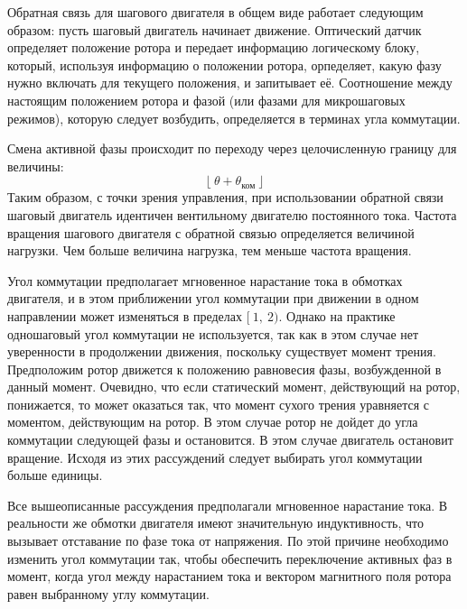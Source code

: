 Обратная связь для шагового двигателя в общем виде работает следующим образом:
пусть шаговый двигатель начинает движение. Оптический датчик определяет положение ротора и передает
информацию логическому блоку, который, используя информацию о положении ротора, орпеделяет, какую фазу
нужно включать для текущего положения, и запитывает её. Соотношение между настоящим положением
ротора и фазой (или фазами для микрошаговых режимов), которую следует возбудить, определяется
в терминах угла коммутации.

Смена активной фазы происходит по переходу через целочисленную границу для величины:
$$
    \lfloor ~\theta + \theta_{\textit{ком}}~ \rfloor
$$
Таким образом, с точки зрения управления, при использовании обратной связи шаговый двигатель идентичен
вентильному двигателю постоянного тока.
Частота вращения шагового двигателя с обратной связью определяется величиной нагрузки. Чем больше величина
нагрузка, тем меньше частота вращения.

Угол коммутации предполагает мгновенное нарастание тока в обмотках двигателя, и в этом приближении
угол коммутации при движении в одном направлении может изменяться в пределах $[~1,~2)$.
Однако на практике одношаговый угол коммутации не используется, так как в этом случае нет
уверенности в продолжении движения, поскольку существует момент трения. Предположим ротор движется к
положению равновесия фазы, возбужденной в данный момент. Очевидно, что если статический момент, действующий
на ротор, понижается, то может оказаться так, что момент сухого трения уравняется с моментом,
действующим на ротор. В этом случае ротор не дойдет до угла коммутации следующей фазы и
остановится. В этом случае двигатель остановит вращение. Исходя из этих рассуждений следует
выбирать угол коммутации больше единицы.

Все вышеописанные рассуждения предполагали мгновенное нарастание тока. В реальности же обмотки двигателя
имеют значительную индуктивность, что вызывает отставание по фазе тока от напряжения.
По этой причине необходимо изменить угол коммутации так, чтобы обеспечить переключение активных фаз
в момент, когда угол между нарастанием тока и вектором магнитного поля ротора равен выбранному углу коммутации.

